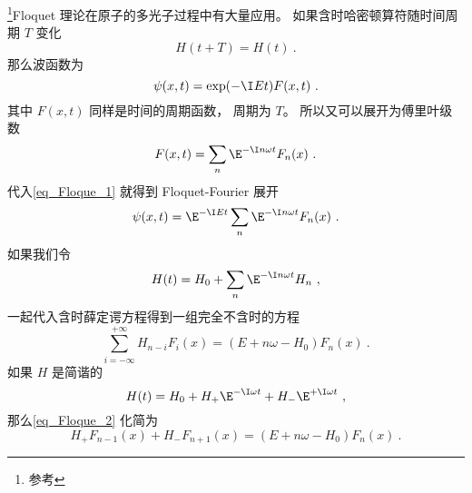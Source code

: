 

\footnote{参考\cite{Bransden}}Floquet 理论在原子的多光子过程中有大量应用。 如果含时哈密顿算符随时间周期 $T$ 变化
\begin{equation}
H(t+T) = H(t)~.
\end{equation}
那么波函数为
\begin{equation}\label{eq_Floque_1}
\psi(x, t) = \exp(-\I Et) F(x, t)~.
\end{equation}
其中 $F(x, t)$ 同样是时间的周期函数， 周期为 $T$。 所以又可以展开为傅里叶级数
\begin{equation}
F(x, t) = \sum_{n} \E^{-\I n\omega t} F_n(x)~.
\end{equation}
代入\autoref{eq_Floque_1} 就得到 Floquet-Fourier 展开
\begin{equation}
\psi(x, t) = \E^{-\I Et} \sum_{n} \E^{-\I n\omega t} F_n(x)~.
\end{equation}
如果我们令
\begin{equation}
H(t) = H_0 + \sum_{n} \E^{-\I n\omega t} H_n~,
\end{equation}
一起代入含时薛定谔方程得到一组完全不含时的方程
\begin{equation}\label{eq_Floque_2}
\sum_{i=-\infty}^{+\infty} H_{n-i} F_i(x) = (E + n\omega - H_0) F_n(x)~.
\end{equation}
如果 $H$ 是简谐的
\begin{equation}
H(t) = H_0 + H_+\E^{-\I\omega t} + H_-\E^{+\I\omega t}~,
\end{equation}
那么\autoref{eq_Floque_2} 化简为
\begin{equation}
H_{+} F_{n-1}(x) + H_{-} F_{n+1}(x) = (E + n\omega - H_0) F_n(x)~.
\end{equation}
